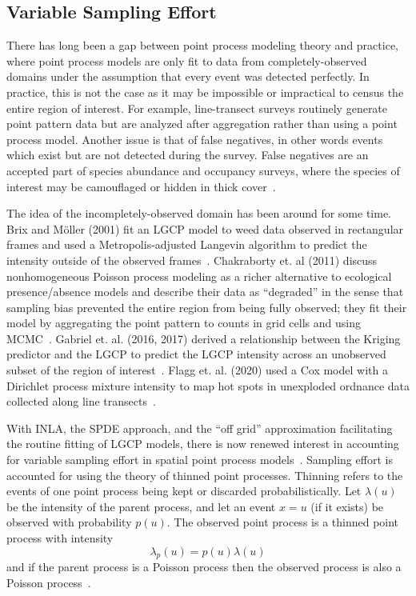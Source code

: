 \documentclass[]{interact}
\begin{document}
\subsection{Variable Sampling Effort}
\label{veffort}

There has long been a gap between point process modeling theory and practice,
where point process models are only fit to data from completely-observed
domains under the assumption that every event was detected perfectly. In
practice, this is not the case as it may be impossible or impractical to census
the entire region of interest. For example, line-transect surveys routinely
generate point pattern data but are analyzed after aggregation rather than
using a point process model. Another issue is that of false negatives, in other
words events which exist but are not detected during the survey. False
negatives are an accepted part of species abundance and occupancy surveys,
where the species of interest may be camouflaged or hidden in thick
cover~\cite{linkbarker,bucklandetal,mackenzieetal}.

The idea of the incompletely-observed domain has been around for some time.
Brix and M\"{o}ller (2001) fit an LGCP model to weed data observed in
rectangular frames and used a Metropolis-adjusted Langevin algorithm
to predict the intensity outside of the observed frames~\cite{brixmoeller}.
Chakraborty et. al (2011) discuss nonhomogeneous Poisson process modeling as
a richer alternative to ecological presence/absence models and describe their
data as ``degraded'' in the sense that sampling bias prevented the entire
region from being fully observed; they fit their model by aggregating the
point pattern to counts in grid cells and using MCMC~\cite{chakrabortyetal}.
Gabriel et. al. (2016, 2017) derived a relationship between the Kriging
predictor and the LGCP to predict the LGCP intensity across an unobserved
subset of the region of interest~\cite{gabrieletal2016, gabrieletal2017}. 
Flagg et. al. (2020) used a Cox model with a Dirichlet process mixture
intensity to map hot spots in unexploded ordnance data collected along
line transects~\cite{flagg2020}.

With INLA, the SPDE approach, and the ``off grid'' approximation
facilitating the routine fitting of LGCP models, there is now renewed interest
in accounting for variable sampling effort in spatial point process
models~\cite{simpsonetal,yuanetal}. Sampling effort is accounted for using the theory of thinned point processes.
Thinning refers to the events of one point process being kept or discarded
probabilistically. Let \(\lambda(u)\) be the intensity of the parent process,
and let an event \(x=u\) (if it exists) be observed with probability
\(p(u)\). The observed point process is a thinned point process with
intensity
\begin{equation}
\lambda_{p}(u) = p(u) \lambda(u) \label{thinintensity}
\end{equation}
and if the parent process is a Poisson process then the observed process is
also a Poisson process~\cite{moellerbook}.
\end{document}
